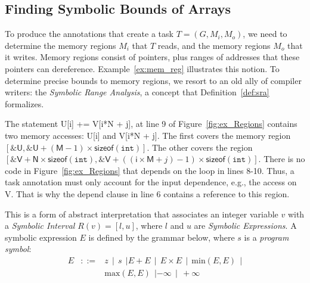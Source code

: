\documentclass[sigplan,10pt,review,anonymous]{acmart}
\begin{document}
\subsection{Finding Symbolic Bounds of Arrays}
\label{sub:sra}

To produce the annotations that create a task $T = (G, M_i, M_o)$, we need to
determine the memory regions $M_i$ that $T$ reads, and the memory regions $M_o$
that it writes.
Memory regions consist of pointers, plus ranges of addresses that these pointers
can dereference.
Example~\ref{ex:mem_reg} illustrates this notion.
To determine precise bounds to memory regions, we resort to an old ally of
compiler writers: the {\em Symbolic Range Analysis}, a concept that
Definition~\ref{def:sra} formalizes.

\begin{example}
\label{ex:mem_reg}
The statement \textsf{U[i] += V[i*N + j]}, at line 9 of
Figure~\ref{fig:ex_Regions} contains two memory accesses: \textsf{U[i]} and
\textsf{V[i*N + j]}.
The first covers the memory region $[\mathtt{\&}\mathsf{U},
\mathtt{\&}\mathsf{U} + (\mathsf{M} - 1) \times \mathsf{sizeof}(\mathtt{int})]$.
The other covers the region
$[\mathtt{\&}\mathsf{V} + \mathsf{N} \times \mathsf{sizeof}(\mathtt{int}), \mathtt{\&}\mathsf{V} + ((\mathsf{i} \times \mathsf{M} + j) - 1) \times \mathsf{sizeof}(\mathtt{int})]$.
There is no code in Figure~\ref{fig:ex_Regions} that depends on the
loop in lines 8-10.
Thus, a task annotation must only account for the input dependence, e.g., the
access on \textsf{V}.
That is why the \textsf{depend} clause in line 6 contains a reference to this
region.
\end{example}

\begin{definition}
\label{def:sra}
This is a form of abstract interpretation that associates
an integer variable $v$ with a {\em Symbolic Interval} $R(v) = [l, u]$, where
$l$ and $u$ are {\em Symbolic Expressions}.
A symbolic expression $E$ is defined by the grammar below, where $s$ is a
{\em program symbol}:
\renewcommand{\arraystretch}{0.9}
\[
\begin{array}{rcl}
E & ::= & z \ \ | \ \ s \ \ | E + E \ \ | \ \ E \times E \ \ | \ \  \mbox{min}(E, E) \ \ | \\
&  & \mbox{max}(E, E) \ \ | -\infty \ \ | \ \ +\infty
\end{array}
\]
\end{definition}
\end{document}
